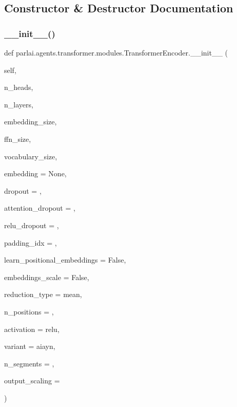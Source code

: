 \subsection{Constructor \& Destructor Documentation}
\mbox{\label{classparlai_1_1agents_1_1transformer_1_1modules_1_1TransformerEncoder_a362f8b951877f3712ca59f0fb6a0ae9c}} 
\subsubsection{\texorpdfstring{\+\_\+\+\_\+init\+\_\+\+\_\+()}{\_\_init\_\_()}}
{\footnotesize\ttfamily def parlai.\+agents.\+transformer.\+modules.\+Transformer\+Encoder.\+\_\+\+\_\+init\+\_\+\+\_\+ (\begin{DoxyParamCaption}\item[{}]{self,  }\item[{}]{n\+\_\+heads,  }\item[{}]{n\+\_\+layers,  }\item[{}]{embedding\+\_\+size,  }\item[{}]{ffn\+\_\+size,  }\item[{}]{vocabulary\+\_\+size,  }\item[{}]{embedding = {\ttfamily None},  }\item[{}]{dropout = {},  }\item[{}]{attention\+\_\+dropout = {},  }\item[{}]{relu\+\_\+dropout = {},  }\item[{}]{padding\+\_\+idx = {},  }\item[{}]{learn\+\_\+positional\+\_\+embeddings = {\ttfamily False},  }\item[{}]{embeddings\+\_\+scale = {\ttfamily False},  }\item[{}]{reduction\+\_\+type = {\ttfamily \textquotesingle{}mean\textquotesingle{}},  }\item[{}]{n\+\_\+positions = {},  }\item[{}]{activation = {\ttfamily \textquotesingle{}relu\textquotesingle{}},  }\item[{}]{variant = {\ttfamily \textquotesingle{}aiayn\textquotesingle{}},  }\item[{}]{n\+\_\+segments = {},  }\item[{}]{output\+\_\+scaling = {} }\end{DoxyParamCaption})}



